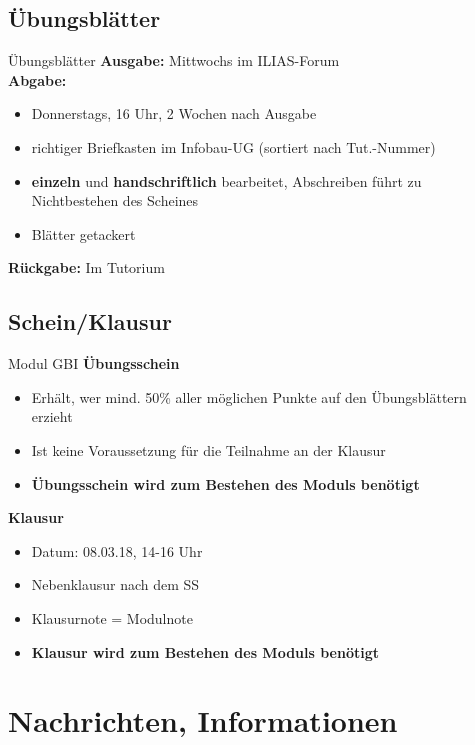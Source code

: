 \subsection{Übungsblätter}
	\begin{frame}{Übungsblätter}
		\textbf{Ausgabe:} Mittwochs im ILIAS-Forum \\
		\pause
		\textbf{Abgabe:}
			\begin{itemize}
				\item Donnerstags, 16 Uhr, 2 Wochen nach Ausgabe
				\item richtiger Briefkasten im Infobau-UG (sortiert nach Tut.-Nummer)
				\pause
				\item \textbf{einzeln} und \textbf{handschriftlich} bearbeitet, Abschreiben führt zu Nichtbestehen des Scheines
				\item Blätter getackert
			\end{itemize}
		\pause	
		\textbf{Rückgabe:} Im Tutorium
	\end{frame}
\subsection{Schein/Klausur}
 \begin{frame}{Modul GBI}
		\textbf{Übungsschein}
			\begin{itemize}
				\item Erhält, wer mind. 50\% aller möglichen Punkte auf den Übungsblättern erzieht
				\item Ist keine Voraussetzung für die Teilnahme an der Klausur
				\item \textbf{Übungsschein wird zum Bestehen des Moduls benötigt} 
			\end{itemize}
		\pause	
		\textbf{Klausur}
		\begin{itemize}
				\item Datum: 08.03.18, 14-16 Uhr
				\item Nebenklausur nach dem SS
				\item Klausurnote = Modulnote
				\item \textbf{Klausur wird zum Bestehen des Moduls benötigt} 
			\end{itemize}
	\end{frame}
	

\section[Nachrichten]{Nachrichten, Informationen}
